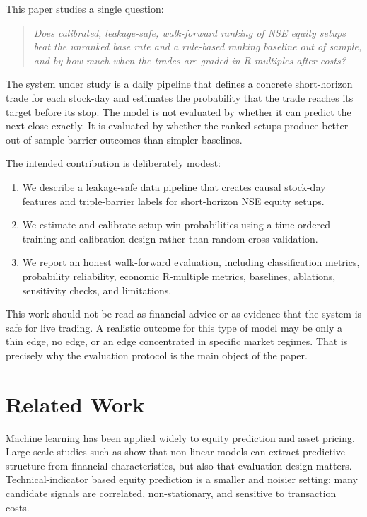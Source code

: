 \documentclass[11pt]{article}
\begin{document}
This paper studies a single question:

\begin{quote}
\emph{Does calibrated, leakage-safe, walk-forward ranking of NSE equity setups
beat the unranked base rate and a rule-based ranking baseline out of sample,
and by how much when the trades are graded in R-multiples after costs?}
\end{quote}

The system under study is a daily pipeline that defines a concrete short-horizon
trade for each stock-day and estimates the probability that the trade reaches
its target before its stop. The model is not evaluated by whether it can predict
the next close exactly. It is evaluated by whether the ranked setups produce
better out-of-sample barrier outcomes than simpler baselines.

The intended contribution is deliberately modest:

\begin{enumerate}[leftmargin=*]
    \item We describe a leakage-safe data pipeline that creates causal
    stock-day features and triple-barrier labels for short-horizon NSE equity
    setups.
    \item We estimate and calibrate setup win probabilities using a
    time-ordered training and calibration design rather than random
    cross-validation.
    \item We report an honest walk-forward evaluation, including classification
    metrics, probability reliability, economic R-multiple metrics, baselines,
    ablations, sensitivity checks, and limitations.
\end{enumerate}

This work should not be read as financial advice or as evidence that the system
is safe for live trading. A realistic outcome for this type of model may be only
a thin edge, no edge, or an edge concentrated in specific market regimes. That
is precisely why the evaluation protocol is the main object of the paper.

\section{Related Work}

Machine learning has been applied widely to equity prediction and asset pricing.
Large-scale studies such as \citet{gu2020empirical} show that non-linear models
can extract predictive structure from financial characteristics, but also that
evaluation design matters. Technical-indicator based equity prediction is a
smaller and noisier setting: many candidate signals are correlated, non-stationary,
and sensitive to transaction costs.
\end{document}
